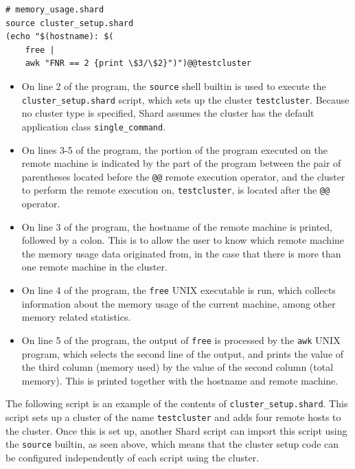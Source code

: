\documentclass[oneside]{report}
\begin{document}
\begin{minipage}[c]{\textwidth-15pt}
  \begin{lstlisting}[language=Shard]
# memory_usage.shard
source cluster_setup.shard
(echo "$(hostname): $(
    free |
    awk "FNR == 2 {print \$3/\$2}")")@@testcluster
\end{lstlisting}
  \smallskip
\end{minipage}

\begin{itemize}
  \item
        \begin{sloppypar}
          On line 2 of the program, the \texttt{source} shell builtin is used to execute the \texttt{cluster\_setup.shard} script, which sets up the cluster \texttt{testcluster}.
          Because no cluster type is specified, Shard assumes the cluster has the default application class \texttt{single\_command}.
        \end{sloppypar}
  \item On lines 3-5 of the program, the portion of the program executed on the remote machine is indicated by the part of the program between the pair of parentheses located before the \texttt{@@} remote execution operator, and the cluster to perform the remote execution on, \texttt{testcluster}, is located after the \texttt{@@} operator.
  \item On line 3 of the program, the hostname of the remote machine is printed, followed by a colon. This is to allow the user to know which remote machine the memory usage data originated from, in the case that there is more than one remote machine in the cluster.
  \item On line 4 of the program, the \texttt{free} UNIX executable is run, which collects information about the memory usage of the current machine, among other memory related statistics.
  \item On line 5 of the program, the output of \texttt{free} is processed by the \texttt{awk} UNIX program, which selects the second line of the output, and prints the value of the third column (memory used) by the value of the second column (total memory). This is printed together with the hostname and remote machine.
\end{itemize}

The following script is an example of the contents of \texttt{cluster\_setup.shard}.
This script sets up a cluster of the name \texttt{testcluster} and adds four remote hosts to the cluster.
Once this is set up, another Shard script can import this script using the \texttt{source} builtin, as seen above, which means that the cluster setup code can be configured independently of each script using the cluster.
\end{document}
